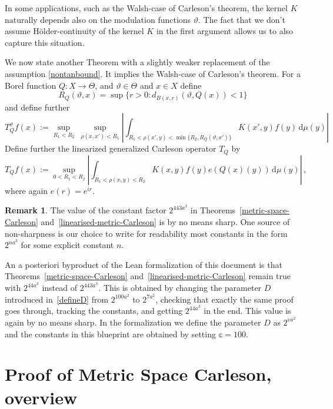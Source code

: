 \documentclass[10pt,a4paper]{article}
\theoremstyle{plain}
\theoremstyle{definition}
\newtheorem{remark}[theorem]{Remark}
\numberwithin{equation}{subsection}
\newcommand{\tQ}{{Q}}
\newcommand{\mfa}{{\vartheta}}
\newcommand{\Mf}{{\Theta}}
\begin{document}
In some applications, such as the Walsh-case of Carleson's theorem, the kernel $K$ naturally depends also on the modulation functions $\mfa$.
The fact that we don't assume H\"older-continuity of the kernel $K$ in the first argument allows us to also capture this situation.

We now state another Theorem with a slightly weaker replacement of the assumption \eqref{nontanbound}.
It implies the Walsh-case of Carleson's theorem.
For a Borel function $\tQ:X\to \Mf$, and $\mfa \in \Mf$ and $x\in X$ define
\begin{equation}
    R_{\tQ}(\mfa,x)=\sup\{r>0:d_{B(x,r)}(\mfa, \tQ(x))<1\}
\end{equation}
and define further
\begin{equation}
    \label{def-lin-star-op}
    T_{\tQ}^\mfa f(x):=\sup_{R_1<R_2} \ \sup_{\rho(x,x')<R_1}
    \left|\int_{R_1< \rho(x',y) < \min\{R_2, R_{\tQ}(\mfa,x')\}} K(x',y) f(y) \, \mathrm{d}\mu(y) \right|
\end{equation}
Define further the linearized generalized Carleson operator $T_\tQ$ by
\begin{equation}
    \label{def-lin-main-op}
    T_\tQ f(x):= \sup_{0 < R_1 < R_2}\left| \int_{R_1 < \rho(x,y) < R_2} K(x,y) f(y) e(\tQ(x)(y)) \, \mathrm{d}\mu(y) \right|\, ,
\end{equation}
where again $e(r)=e^{ir}$.



\begin{remark}
The value of the constant factor $2^{443a^3}$ in Theorems~\ref{metric-space-Carleson}
and~\ref{linearised-metric-Carleson} is by no means sharp.
One source of non-sharpness is our choice to write for readability most constants in the form $2^{na^3}$ for some explicit constant $n$.

An a posteriori byproduct of the Lean formalization of this document is that Theorems~\ref{metric-space-Carleson}
and~\ref{linearised-metric-Carleson} remain true with $2^{44a^3}$ instead of $2^{443a^3}$. This is obtained by
changing the parameter $D$ introduced in~\eqref{defineD} from $2^{100a^2}$ to $2^{7a^2}$, checking that exactly the same
proof goes through, tracking the constants, and getting $2^{44a^3}$ in the end. This value is again by no means sharp.
In the formalization we define the parameter $D$ as $2^{\mathbb{c}a^2}$
and the constants in this blueprint are obtained by setting $\mathbb{c} = 100$.
\end{remark}

\section{Proof of Metric Space Carleson, overview}
\label{overviewsection}
\end{document}
